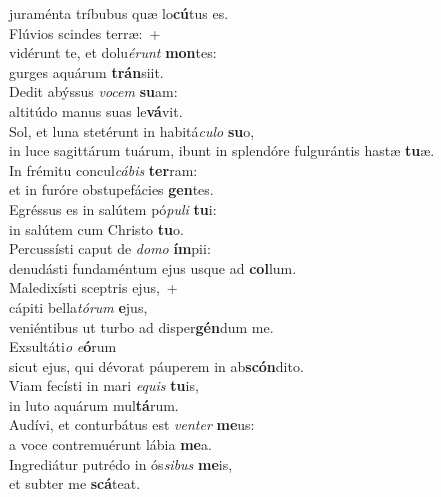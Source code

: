 \evenverse juraménta tríbubus quæ lo\textbf{cú}tus es.\\
\oddverse Flúvios scindes terræ:~+\\
\oddverse  vidérunt te, et dolu\textit{é}\textit{runt} \textbf{mon}tes:~\*\\
\oddverse gurges aquárum \textbf{trán}siit.\\
\evenverse Dedit abýssus \textit{vo}\textit{cem} \textbf{su}am:~\*\\
\evenverse altitúdo manus suas le\textbf{vá}vit.\\
\oddverse Sol, et luna stetérunt in habitá\textit{cu}\textit{lo} \textbf{su}o,~\*\\
\oddverse in luce sagittárum tuárum, ibunt in splendóre fulgurántis hastæ \textbf{tu}æ.\\
\evenverse In frémitu concul\textit{cá}\textit{bis} \textbf{ter}ram:~\*\\
\evenverse et in furóre obstupefácies \textbf{gen}tes.\\
\oddverse Egréssus es in salútem pó\textit{pu}\textit{li} \textbf{tu}i:~\*\\
\oddverse in salútem cum Christo \textbf{tu}o.\\
\evenverse Percussísti caput de \textit{do}\textit{mo} \textbf{ím}pii:~\*\\
\evenverse denudásti fundaméntum ejus usque ad \textbf{col}lum.\\
\oddverse Maledixísti sceptris ejus,~+\\
\oddverse  cápiti bella\textit{tó}\textit{rum} \textbf{e}jus,~\*\\
\oddverse veniéntibus ut turbo ad disper\textbf{gén}dum me.\\
\evenverse Exsultáti\textit{o} \textit{e}\textbf{ó}rum~\*\\
\evenverse sicut ejus, qui dévorat páuperem in ab\textbf{scón}dito.\\
\oddverse Viam fecísti in mari \textit{e}\textit{quis} \textbf{tu}is,~\*\\
\oddverse in luto aquárum mul\textbf{tá}rum.\\
\evenverse Audívi, et conturbátus est \textit{ven}\textit{ter} \textbf{me}us:~\*\\
\evenverse a voce contremuérunt lábia \textbf{me}a.\\
\oddverse Ingrediátur putrédo in ós\textit{si}\textit{bus} \textbf{me}is,~\*\\
\oddverse et subter me \textbf{scá}teat.\\
